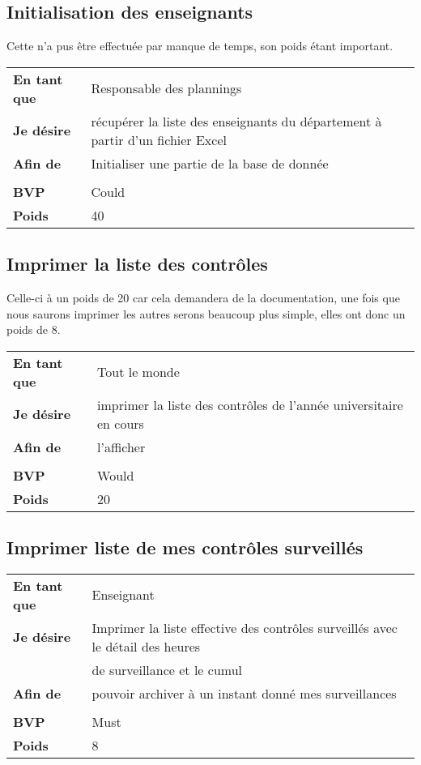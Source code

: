 \subsection{Initialisation des enseignants}		
Cette \US{} n'a pus être effectuée par manque de temps, son poids étant important.

\begin{tabular}{ll}
	\textbf{En tant que}	&	Responsable des plannings\\
	\textbf{Je désire}& récupérer la liste des enseignants du département à partir d'un fichier Excel\textregistered\\	
	\textbf{Afin de}	& Initialiser une partie de la base de donnée\\	
	&\\
	\textbf{BVP} & Could\\
	\textbf{Poids} & 40\\
\end{tabular}
\subsection{Imprimer la liste des contrôles}
Celle-ci à un poids de 20 car cela demandera de la documentation, une fois que nous saurons imprimer
les autres \USs{} serons beaucoup plus simple, elles ont donc un poids de 8.

\begin{tabular}{ll}
	\textbf{En tant que}	&	Tout le monde \\
	\textbf{Je désire}&	imprimer la liste des contrôles de l'année universitaire en cours\\
	\textbf{Afin de}	& l'afficher\\
	&\\
	\textbf{BVP} & Would\\
	\textbf{Poids} & 20\\
\end{tabular}

\subsection{Imprimer liste de mes contrôles surveillés}
\begin{tabular}{ll}
	\textbf{En tant que}	&	Enseignant \\
	\textbf{Je désire}&	Imprimer la liste effective des contrôles surveillés avec le détail des heures\\
	&de surveillance et le cumul\\
	\textbf{Afin de}	&	pouvoir archiver à un instant donné mes surveillances\\
	&\\
	\textbf{BVP} & Must\\
	\textbf{Poids} & 8\\
\end{tabular}

